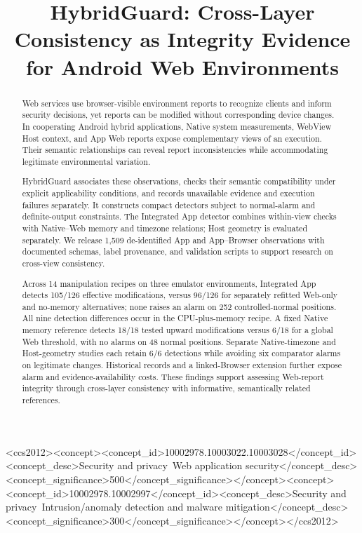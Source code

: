 \title{HybridGuard: Cross-Layer Consistency as Integrity Evidence for Android Web Environments}
\begin{abstract}
Web services use browser-visible environment reports to recognize clients and inform security decisions, yet reports can be modified without corresponding device changes. In cooperating Android hybrid applications, Native system measurements, WebView Host context, and App Web reports expose complementary views of an execution. Their semantic relationships can reveal report inconsistencies while accommodating legitimate environmental variation.

HybridGuard associates these observations, checks their semantic compatibility under explicit applicability conditions, and records unavailable evidence and execution failures separately. It constructs compact detectors subject to normal-alarm and definite-output constraints. The Integrated App detector combines within-view checks with Native--Web memory and timezone relations; Host geometry is evaluated separately. We release 1,509 de-identified App and App--Browser observations with documented schemas, label provenance, and validation scripts to support research on cross-view consistency.

Across 14 manipulation recipes on three emulator environments, Integrated App detects 105/126 effective modifications, versus 96/126 for separately refitted Web-only and no-memory alternatives; none raises an alarm on 252 controlled-normal positions. All nine detection differences occur in the CPU-plus-memory recipe. A fixed Native memory reference detects 18/18 tested upward modifications versus 6/18 for a global Web threshold, with no alarms on 48 normal positions. Separate Native-timezone and Host-geometry studies each retain 6/6 detections while avoiding six comparator alarms on legitimate changes. Historical records and a linked-Browser extension further expose alarm and evidence-availability costs. These findings support assessing Web-report integrity through cross-layer consistency with informative, semantically related references.
\end{abstract}
\begin{CCSXML}
<ccs2012><concept><concept_id>10002978.10003022.10003028</concept_id><concept_desc>Security and privacy~Web application security</concept_desc><concept_significance>500</concept_significance></concept><concept><concept_id>10002978.10002997</concept_id><concept_desc>Security and privacy~Intrusion/anomaly detection and malware mitigation</concept_desc><concept_significance>300</concept_significance></concept></ccs2012>
\end{CCSXML}
\maketitle

